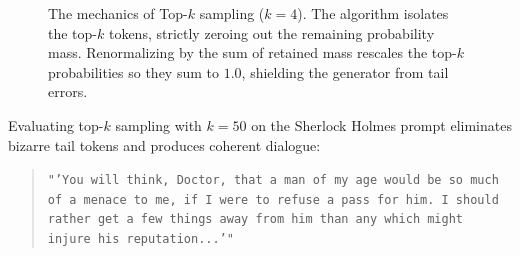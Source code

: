 \documentclass[../../main.tex]{subfiles}
\begin{document}
\begin{figure}[htbp]
\caption{The mechanics of Top-$k$ sampling ($k=4$). The algorithm isolates the top-$k$ tokens, strictly zeroing out the remaining probability mass. Renormalizing by the sum of retained mass rescales the top-$k$ probabilities so they sum to $1.0$, shielding the generator from tail errors.}
\label{fig:top_k_truncation_mechanics}
\end{figure}

Evaluating top-$k$ sampling with $k=50$ on the Sherlock Holmes prompt eliminates bizarre tail tokens and produces coherent dialogue:
\begin{quote}
\texttt{"'You will think, Doctor, that a man of my age would be so much of a menace to me, if I were to refuse a pass for him. I should rather get a few things away from him than any which might injure his reputation...'"}
\end{quote}
\end{document}
